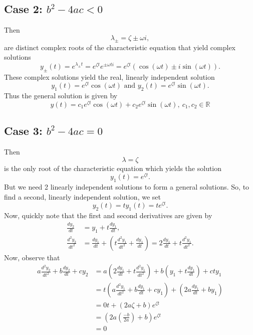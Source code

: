 \documentclass[11pt]{article}
\newcommand{\reals}{\mathbb{R}}
\begin{document}
\subsection*{Case 2: $b^2 - 4ac < 0$}
Then
\[ \lambda_\pm = \zeta \pm \omega i, \]
are distinct complex roots of the characteristic equation that yield complex solutions
\[ y_\pm (t) = e^{\lambda_\pm t} = e^{\zeta t} e^{\pm \omega t i} = e^{\zeta t} (\cos(\omega t) \pm i\sin(\omega t)). \]
These complex solutions yield the real, linearly independent solution
\[ y_1(t) = e^{\zeta t} \cos(\omega t) \text{ and } y_2(t) = e^{\zeta t} \sin(\omega t). \]
Thus the general solution is given by
\[ y(t) = c_1 e^{\zeta t} \cos(\omega t) + c_2 e^{\zeta t} \sin(\omega t),\ c_1, c_2 \in \reals \]

\subsection*{Case 3: $b^2 - 4ac = 0$}
Then
\[ \lambda = \zeta \]
is the only root of the characteristic equation which yields the solution
\[ y_1(t) = e^{\zeta t}. \]
But we need 2 linearly independent solutions to form a general solutions. So, to find a second, linearly independent solution, we set
\[ y_2(t) = t y_1(t) = t e^{\zeta t}. \]
Now, quickly note that the first and second derivatives are given by
\begin{align*}
\frac{dy_2}{dt} &= y_1 + t \frac{dy_1}{dt}, \\
\frac{d^2 y_2}{dt^2} &= \frac{dy_1}{dt} + \left( t\frac{d^2 y_1}{dt^2} +  \frac{dy_1}{dt} \right) = 2 \frac{dy_1}{dt} + t \frac{d^2 y_1}{dt^2}.
\end{align*}
Now, observe that
\begin{align*}
a \frac{d^2 y_2}{dt^2} + b \frac{dy_2}{dt} + c y_2 &= a \left( 2 \frac{dy_1}{dt} + t \frac{d^2 y_1}{dt^2} \right) + b \left( y_1 + t \frac{dy_1}{dt} \right) + cty_1 \\
&= t \left( a \frac{d^2 y_1}{dt^2} + b \frac{dy_1}{dt} + cy_1 \right) + \left( 2a \frac{dy_1}{dt} + by_1 \right) \\
&= 0t + (2a \zeta + b)e^{\zeta t} \\
&= \left( 2a \left( \frac{-b}{2a} \right) + b \right)e^{\zeta t} \\
&= 0
\end{align*}
\end{document}
